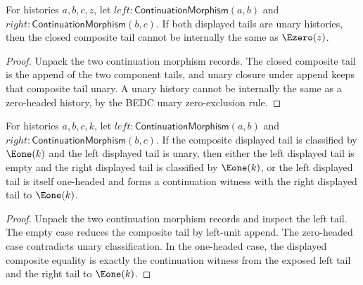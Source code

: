 \begin{theorem}
\label{thm:category-continuation-morphism-comp-unary-tail-e0-absurd}
For histories $a,b,c,z$, let
$left:\mathsf{ContinuationMorphism}(a,b)$ and
$right:\mathsf{ContinuationMorphism}(b,c)$. If both displayed tails are unary
histories, then the closed composite tail cannot be internally the same as
$\Ezero(z)$.
\end{theorem}
\begin{proof}
Unpack the two continuation morphism records. The closed composite tail is the
append of the two component tails, and unary closure under append keeps that
composite tail unary. A unary history cannot be internally the same as a
zero-headed history, by the BEDC unary zero-exclusion rule.
\end{proof}

\begin{theorem}
\label{thm:continuation-morphism-comp-e1-tail-left-cases}
For histories $a,b,c,k$, let
$left:\mathsf{ContinuationMorphism}(a,b)$ and
$right:\mathsf{ContinuationMorphism}(b,c)$. If the composite displayed tail is
classified by $\Eone(k)$ and the left displayed tail is unary, then either the
left displayed tail is empty and the right displayed tail is classified by
$\Eone(k)$, or the left displayed tail is itself one-headed and forms a
continuation witness with the right displayed tail to $\Eone(k)$.
\end{theorem}
\begin{proof}
Unpack the two continuation morphism records and inspect the left tail. The
empty case reduces the composite tail by left-unit append. The zero-headed case
contradicts unary classification. In the one-headed case, the displayed
composite equality is exactly the continuation witness from the exposed left
tail and the right tail to $\Eone(k)$.
\end{proof}

